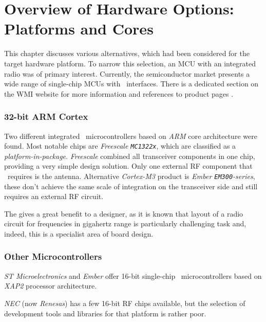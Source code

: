 \section{Overview of Hardware Options:\\Platforms and Cores}


 This chapter discusses various alternatives, which had been
 considered for the target hardware platform. To narrow this
 selection, an MCU with an integrated radio was of primary
 interest. Currently, the semiconductor market presents a
 wide range of single-chip MCUs with \WPAN\ interfaces. There
 is a dedicated section on the WMI website for more information
 and references to product pages \cite{wmi:wiki:chips1,
 wmi:wiki:chips2}.

\subsubsection{32-bit ARM Cortex}

 Two different integrated \WPAN\ microcontrollers based on 
 \emph{ARM} core architecture were found. Most notable
 chips are \emph{Freescale \texttt{MC1322x}}, which are
 classified as a \emph{platform-in-package}. \emph{Freescale}
 combined all transceiver components in one chip, providing
 a very simple design solution. Only one external RF component
 that \MCX\ requires is the antenna. Alternative \emph{Cortex-M3}
 product is \emph{Ember \texttt{EM300}-series}, these don't
 achieve the same scale of integration on the transceiver side
 and still requires an external RF circuit.

 The  gives a great benefit to a designer, as it
 is known that layout of a radio circuit for frequencies in
 gigahertz range is particularly challenging task and, indeed,
 this is a specialist area of board design.

\subsubsection{Other Microcontrollers}

 \emph{ST Microelectronics} and \emph{Ember} offer 16-bit single-chip
 \WPAN\ microcontrollers based on \emph{XAP2} processor architecture.

 \emph{NEC} (now \emph{Renesas}) has a few 16-bit RF chips available,
 but the selection of development tools and libraries for that platform
 is rather poor.

